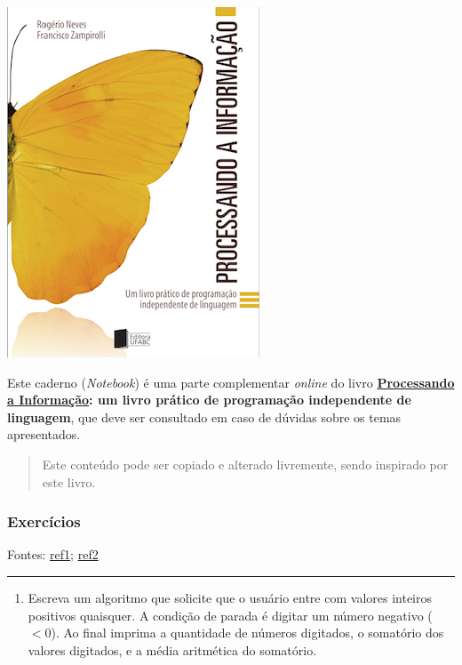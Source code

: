 \documentclass[12pt,a4paper]{article}
\renewcommand{\linethickness}{0.05em}
\providecommand{\tightlist}{%
      \setlength{\itemsep}{0pt}\setlength{\parskip}{0pt}}
\begin{document}
    \includegraphics{"figs/Capa_Processando_Informacao.jpg"}

Este caderno (\emph{Notebook}) é uma parte complementar \emph{online} do
livro
\textbf{\href{https://editora.ufabc.edu.br/matematica-e-ciencias-da-computacao/58-processando-a-informacao}{Processando
a Informação}: um livro prático de programação independente de
linguagem}, que deve ser consultado em caso de dúvidas sobre os temas
apresentados.

\begin{quote}
Este conteúdo pode ser copiado e alterado livremente, sendo inspirado
por este livro.
\end{quote}

    \hypertarget{exercuxedcios}{%
\subsubsection{Exercícios}\label{exercuxedcios}}

Fontes:
\href{https://docente.ifrn.edu.br/jonathanpereira/disciplinas/algoritmos/estruturas-de-repeticao/view}{ref1};
\href{https://www.inf.pucrs.br/~pinho/LaproI/Exercicios/Repeticao/Lista1.htm}{ref2}

    \begin{center}\rule{0.5\linewidth}{\linethickness}\end{center}

\begin{enumerate}
\def\labelenumi{\arabic{enumi}.}
\tightlist
\item
  Escreva um algoritmo que solicite que o usuário entre com valores
  inteiros positivos quaisquer. A condição de parada é digitar um número
  negativo (\(<0\)). Ao final imprima a quantidade de números digitados,
  o somatório dos valores digitados, e a média aritmética do somatório.
\end{enumerate}
\end{document}
